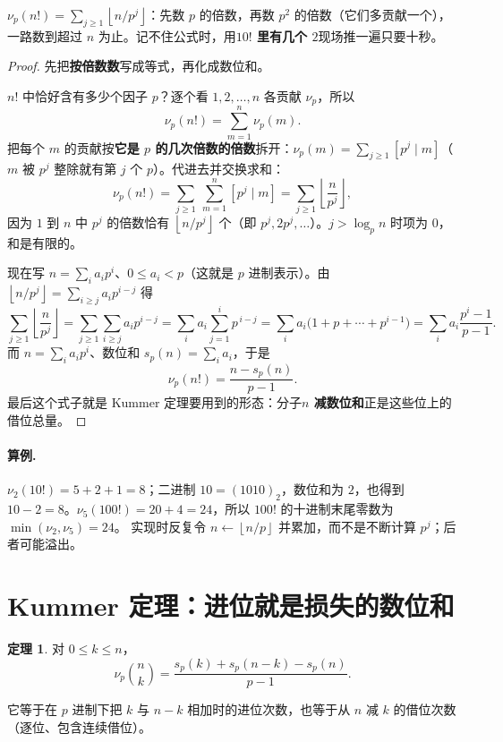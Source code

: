 \documentclass[UTF8,a4paper,11pt,twoside,openright,fontset=fandol]{ctexbook}
\theoremstyle{definition}
\newtheorem{theorem}[definition]{定理}
\newcommand{\floor}[1]{\left\lfloor #1\right\rfloor}
\newcommand{\iva}[1]{\left[#1\right]}
\begin{document}
\begin{tip}[一句话版]
$\nu_p(n!)=\sum_{j\ge1}\floor{n/p^j}$：先数 $p$ 的倍数，再数 $p^2$ 的倍数（它们多贡献一个），一路数到超过 $n$ 为止。记不住公式时，用\textbf{$10!$ 里有几个 $2$}现场推一遍只要十秒。
\end{tip}

\begin{proof}
先把\textbf{按倍数数}写成等式，再化成数位和。

$n!$ 中恰好含有多少个因子 $p$？逐个看 $1,2,\ldots,n$ 各贡献 $\nu_p$，所以
\[
 \nu_p(n!)=\sum_{m=1}^{n}\nu_p(m).
\]
把每个 $m$ 的贡献按\textbf{它是 $p$ 的几次倍数的倍数}拆开：$\nu_p(m)=\sum_{j\ge1}\iva{p^j\mid m}$（$m$ 被 $p^j$ 整除就有第 $j$ 个 $p$）。代进去并交换求和：
\[
 \nu_p(n!)=\sum_{j\ge1}\ \sum_{m=1}^{n}\iva{p^j\mid m}=\sum_{j\ge1}\floor{\frac{n}{p^j}},
\]
因为 $1$ 到 $n$ 中 $p^j$ 的倍数恰有 $\floor{n/p^j}$ 个（即 $p^j,2p^j,\ldots$）。$j>\log_p n$ 时项为 $0$，和是有限的。

现在写 $n=\sum_i a_ip^i$、$0\le a_i<p$（这就是 $p$ 进制表示）。由 $\floor{n/p^j}=\sum_{i\ge j}a_ip^{i-j}$ 得
\[
 \sum_{j\ge1}\floor{\frac{n}{p^j}}
 =\sum_{j\ge1}\sum_{i\ge j}a_ip^{i-j}
 =\sum_{i}a_i\sum_{j=1}^{i}p^{\,i-j}
 =\sum_i a_i\big(1+p+\cdots+p^{i-1}\big)
 =\sum_i a_i\frac{p^i-1}{p-1}.
\]
而 $n=\sum_i a_ip^i$、数位和 $s_p(n)=\sum_i a_i$，于是
\[
 \nu_p(n!)=\frac{n-s_p(n)}{p-1}.
\]
最后这个式子就是 Kummer 定理要用到的形态：分子\textbf{$n$ 减数位和}正是这些位上的借位总量。
\end{proof}

\paragraph{算例.} $\nu_2(10!)=5+2+1=8$；二进制 $10=(1010)_2$，数位和为 $2$，也得到 $10-2=8$。$\nu_5(100!)=20+4=24$，所以 $100!$ 的十进制末尾零数为 $\min(\nu_2,\nu_5)=24$。
实现时反复令 $n\gets\floor{n/p}$ 并累加，而不是不断计算 $p^j$；后者可能溢出。


\section{Kummer 定理：进位就是损失的数位和}
\begin{theorem}
对 $0\le k\le n$，
\[
\nu_p\binom nk=\frac{s_p(k)+s_p(n-k)-s_p(n)}{p-1}.
\]


它等于在 $p$ 进制下把 $k$ 与 $n-k$ 相加时的进位次数，也等于从 $n$ 减 $k$ 的借位次数（逐位、包含连续借位）。
\end{theorem}
\end{document}
